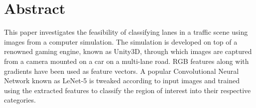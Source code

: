 \chapter*{Abstract}
This paper investigates the feasibility of classifying lanes in a traffic scene using images from a computer simulation. The simulation is developed on top of a renowned gaming engine, known as Unity3D, through which images are captured from a camera mounted on a car on a multi-lane road. RGB features along with gradients have been used as feature vectors. A popular Convolutional Neural Network known as LeNet-5 is tweaked according to input images and trained using the extracted features to classify the region of interest into their respective categories.

